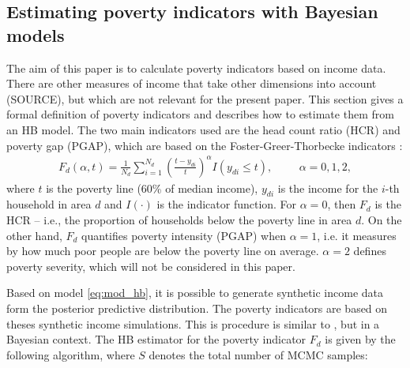 \subsection{Estimating poverty indicators with Bayesian models}
\label{ch:indicators}

The aim of this paper is to calculate poverty indicators based on income data.
There are other measures of income that take other dimensions into account (SOURCE), but which are not relevant for the present paper.
This section gives a formal definition of poverty indicators and describes how to estimate them from an HB model.
The two main indicators used are the head count ratio (HCR) and poverty gap (PGAP), which
are based on the Foster-Greer-Thorbecke indicators \citep{foster_class_1984}:
\begin{gather*}
    F_d(\alpha, t) = \displaystyle \frac 1 {N_d} \sum_{i=1}^{N_d}\left( \frac{t - y_{di}}{t} \right)^\alpha I (y_{di} \le t),
    \hspace{1cm}\alpha = 0, 1, 2,
\end{gather*}
where $t$ is the poverty line (60\% of median income), $y_{di}$ is the income for the $i$-th household in area $d$ and $I(\cdot)$ is the indicator function.
For $\alpha = 0$, then $F_d$ is the HCR – i.e., the proportion of households below the poverty line in area $d$.
On the other hand, $F_d$ quantifies poverty intensity (PGAP) when $\alpha = 1$, i.e. it measures by how much poor people are below the poverty line on average.
$\alpha = 2$ defines poverty severity, which will not be considered in this paper.

Based on model \ref{eq:mod_hb}, it is possible to generate synthetic income data form the posterior predictive distribution.
The poverty indicators are based on theses synthetic income simulations.
This is procedure is similar to \cite{rojas_perilla_data_2020}, but in a Bayesian context.
The HB estimator for the poverty indicator $F_d$ is given by the following algorithm, where $S$ denotes the total number of MCMC samples: \\

